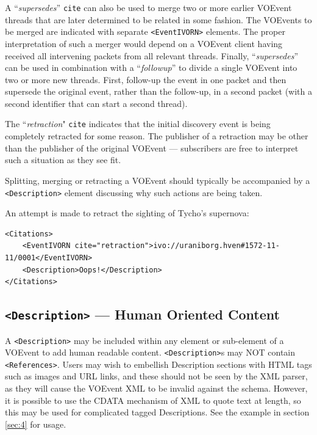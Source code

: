 \documentclass[11pt,a4paper]{ivoa}
\begin{document}
A ``\emph{supersedes}'' {\tt cite} can also be used to merge two or more earlier VOEvent threads that are later determined to be related in some fashion. The VOEvents to be merged are indicated with separate {\tt <EventIVORN>} elements. The proper interpretation of such a merger would depend on a VOEvent client having received all intervening packets from all relevant threads. Finally, ``\emph{supersedes}'' can be used in combination with a ``\emph{followup}'' to divide a single VOEvent into two or more new threads. First, follow-up the event in one packet and then supersede the original event, rather than the follow-up, in a second packet (with a second identifier that can start a second thread). 

The ``\emph{retraction}" {\tt cite} indicates that the initial discovery event is being completely retracted for some reason. The publisher of a retraction may be other than the publisher of the original VOEvent --- subscribers are free to interpret such a situation as they see fit. 

Splitting, merging or retracting a VOEvent should typically be accompanied by a {\tt <Description>} element discussing why such actions are being taken. 

An attempt is made to retract the sighting of Tycho's supernova: 
{\footnotesize
\begin{verbatim}
<Citations>
    <EventIVORN cite="retraction">ivo://uraniborg.hven#1572-11-11/0001</EventIVORN>     
    <Description>Oops!</Description>
</Citations> 
\end{verbatim}}

\subsection{{\tt <Description>} --- Human Oriented Content}
\label{sec:3.8}
A {\tt <Description>} may be included within any element or sub-element of a VOEvent to add human readable content. {\tt <Description>}s may NOT contain {\tt <References>}. Users may wish to embellish Description sections with HTML tags such as images and URL links, and these should not be seen by the XML parser, as they will cause the VOEvent XML to be invalid against the schema. However, it is possible to use the CDATA mechanism of XML to quote text at length, so this may be used for complicated tagged Descriptions. See the example in section \ref{sec:4} for usage. 
\end{document}
